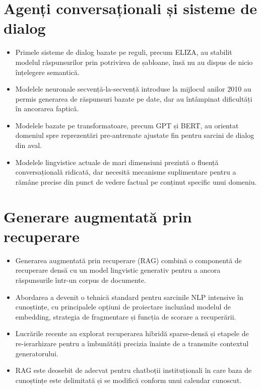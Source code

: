 \documentclass[12pt,a4paper]{report}
\begin{document}
\section{Agenți conversaționali și sisteme de dialog}
\begin{itemize}
    \item Primele sisteme de dialog bazate pe reguli, precum ELIZA, au stabilit modelul răspunsurilor prin potrivirea de șabloane, însă nu au dispus de nicio înțelegere semantică.
    \item Modelele neuronale secvență-la-secvență introduse la mijlocul anilor 2010 au permis generarea de răspunsuri bazate pe date, dar au întâmpinat dificultăți în ancorarea faptică.
    \item Modelele bazate pe transformatoare, precum GPT și BERT, au orientat domeniul spre reprezentări pre-antrenate ajustate fin pentru sarcini de dialog din aval.
    \item Modelele lingvistice actuale de mari dimensiuni prezintă o fluență conversațională ridicată, dar necesită mecanisme suplimentare pentru a rămâne precise din punct de vedere factual pe conținut specific unui domeniu.
\end{itemize}

\section{Generare augmentată prin recuperare}
\begin{itemize}
    \item Generarea augmentată prin recuperare (RAG) combină o componentă de recuperare densă cu un model lingvistic generativ pentru a ancora răspunsurile într-un corpus de documente.
    \item Abordarea a devenit o tehnică standard pentru sarcinile NLP intensive în cunoștințe, cu principalele opțiuni de proiectare incluzând modelul de embedding, strategia de fragmentare și funcția de scorare a recuperării.
    \item Lucrările recente au explorat recuperarea hibridă sparse-densă și etapele de re-ierarhizare pentru a îmbunătăți precizia înainte de a transmite contextul generatorului.
    \item RAG este deosebit de adecvat pentru chatboții instituționali în care baza de cunoștințe este delimitată și se modifică conform unui calendar cunoscut.
\end{itemize}
\end{document}
